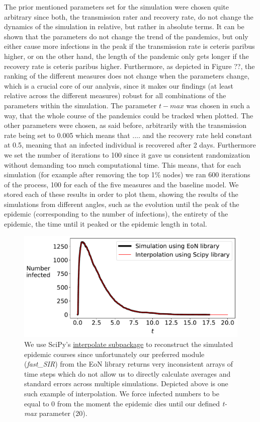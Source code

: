 \documentclass{Template resources/netsci-project}
\begin{document}
The prior mentioned parameters set for the simulation were chosen quite arbitrary since both, the transmission rater and recovery rate, do not change the dynamics of the simulation in relative, but rather in absolute terms. It can be shown that the parameters do not change the trend of the pandemics, but only either cause more infections in the peak if the transmission rate is ceteris paribus higher, or on the other hand, the length of the pandemic only gets longer if the recovery rate is ceteris paribus higher. Furthermore, as depicted in Figure ??, the ranking of the different measures does not change when the parameters change, which is a crucial core of our analysis, since it makes our findings (at least relative across the different measures) robust for all combinations of the parameters within the simulation. The parameter $t-max$ was chosen in such a way, that the whole course of the pandemics could be tracked when plotted. The other parameters were chosen, as said before, arbitrarily with the transmission rate being set to 0.005 which means that .... and the recovery rate held constant at 0.5, meaning that an infected individual is recovered after 2 days. Furthermore we set the number of iterations to 100 since it gave us consistent randomization without demanding too much computational time. This means, that for each simulation (for example after removing the top 1\% nodes) we ran 600 iterations of the process, 100 for each of the five measures and the baseline model. We stored each of these results in order to plot them, showing the results of the simulations from different angles, such as the evolution until the peak of the epidemic (corresponding to the number of infections), the entirety of the epidemic, the time until it peaked or the epidemic length in total. 





\begin{figure}[!ht]
    \centering
    \includegraphics[width=0.5\linewidth]{Figures/interpolation_test.pdf}
    \caption{We use SciPy's \href{https://docs.scipy.org/doc/scipy/reference/interpolate.html}{interpolate subpackage} to reconstruct the simulated epidemic courses since unfortunately our preferred module (\textit{fast\_SIR}) from the EoN library returns very inconsistent arrays of time steps which do not allow us to directly calculate averages and standard errors across multiple simulations. Depicted above is one such example of interpolation. We force infected numbers to be equal to 0 from the moment the epidemic dies until our defined \textit{t-max} parameter (20).}
    \label{fig:interpolation_test}
\end{figure}
\end{document}
